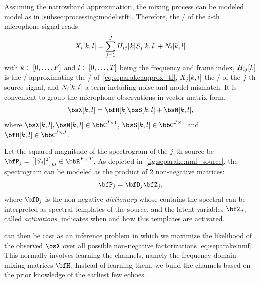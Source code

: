 \mynewline
Assuming the narrowband approximation, the mixing process can be modeled model as in \cref{subsec:processing:model:stft}.
Therefore, the \STFTdef/ of the $i$-th microphone signal reads
\begin{equation}
    \label{eq:separake:stft}
    X_{i}[k,l] = \sum_{j = 1}^{J} H_{ij}[k] S_{j}[k,l] + N_{i}[k,l]
\end{equation}
with $k\in\klist{0,\ldots,F}$ and $l\in\klist{0,\ldots,T}$ being the frequency and frame index,
$H_{ij}[k]$ is the \DFT/ approximating the \RTF/ of~\eqref{eq:separake:approx_tf},
$X_{j}[k,l]$ the \STFT/ of the $j$-th source signal, and $N_{i}[k,l]$ a term including noise and model mismatch.
It is convenient to group the microphone observations in vector-matrix form,
\begin{equation}
    \MICS[k,l] = \FLTSS[k]\SRCS[k,l] + \NSES[k,l]
    ,
\end{equation}
where $\MICS[k,l],  \NSES[k,l] \in \bbC^{\numMics \times 1}$, $\SRCS[k,l] \in \bbC^{\numSrcs \times 1}$ and $\FLTSS[k,l] \in \bbC^{\numMics \times \numSrcs}$.

\mynewline
Let the squared magnitude of the spectrogram of the $j$-th source be $\mP_\idxSrc = \klist{\powerOf{\SRC_\idxSrc}}_{kl} \in \bbR^{F\times T}$.
As depicted in~\cref{fig:separake:nmf_source}, the spectrogram can be modeled as the product of 2 non-negative matrices:
\begin{equation}
    \label{eq:separake:nmf}
    \mP_\idxSrc =  \mD_\idxSrc \mZ_\idxSrc,
\end{equation}
where $\mD_\idxSrc$ is the non-negative \textit{dictionary} whose contains the spectral can be interpreted as spectral templates of the source,
and the latent variables $\mZ_\idxSrc$, called \textit{activations}, indicates when and how this templates are activated.

 can then be cast as an inference problem in which we maximize the likelihood of the observed $\MICS$ over all possible non-negative factorizations \eqref{eq:separake:nmf}.
This normally involves learning the channels, namely the frequency-domain mixing matrices $\FLTSS$.
Instead of learning them, we build the channels based on the prior knowledge of the earliest few echoes.

